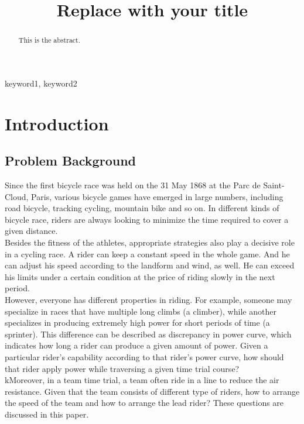 \documentclass{mcmthesis}
\title{Replace with your title}
\begin{document}
  \begin{abstract}
    This is the abstract.
  \end{abstract}

  \begin{keywords}
    keyword1, keyword2
  \end{keywords}
  \maketitle
  \tableofcontents
  \clearpage
  \section{Introduction}
  \subsection{Problem Background}
  Since the first bicycle race was held on the 31 May 1868 at the Parc de Saint-Cloud, Paris, various bicycle games have emerged in large numbers, including road bicycle, tracking cycling, mountain bike and so on. In different kinds of bicycle race, riders are always looking to minimize the time required to cover a given distance.\\
  Besides the fitness of the athletes, appropriate strategies also play a decisive role in a cycling race. A rider can keep a constant speed in the whole game. And he can adjust his speed according to the landform and wind, as well. He can exceed his limits under a certain condition at the price of riding slowly in the next period.\\ 
  However, everyone has different properties in riding. For example, someone may specialize in races that have multiple long climbs (a climber), while another specializes in producing extremely high power for short periods of time (a sprinter). This difference can be described as discrepancy in power curve, which indicates how long a rider can produce a given amount of power. Given a particular rider’s capability according to that rider’s power curve, how should that rider apply power while traversing a given time trial course? \\
  kMoreover, in a team time trial, a team often ride in a line to reduce the air resistance. Given that the team consists of different type of riders, how to arrange the speed of the team and how to arrange the lead rider? These questions are discussed in this paper.\\
\end{document}
